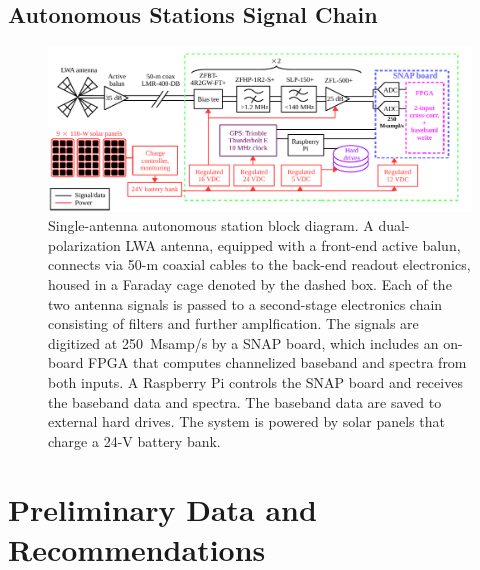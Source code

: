 \documentclass[12pt,a4paper]{report}
\begin{document}
    \section{Autonomous Stations Signal Chain}
    
    \begin{figure}
    	\begin{center}
    		\includegraphics[width=\linewidth]{Figures/albatros_single_schematic.pdf}
    		\caption{Single-antenna autonomous station block diagram.  A dual-polarization LWA antenna, equipped with a front-end active balun, connects via 50-m coaxial cables to the back-end readout electronics, housed in a Faraday cage denoted by the dashed box. Each of the two antenna signals is passed to a second-stage	electronics chain consisting of filters and further amplfication.  The signals are digitized at 250~Msamp/s by a SNAP board, which includes an on-board FPGA that computes channelized baseband and spectra from both inputs.  A Raspberry Pi controls the SNAP board and receives the baseband data and spectra.  The baseband data are saved to external hard drives. The system is powered by solar panels that charge a 24-V battery	bank.}
    		\label{Fig:albatros1_schem}
    	\end{center}
    \end{figure}
    
        \subsection{}
        \subsection{}

\chapter{Preliminary Data and Recommendations}

                                                         
{}
    
\end{document}

